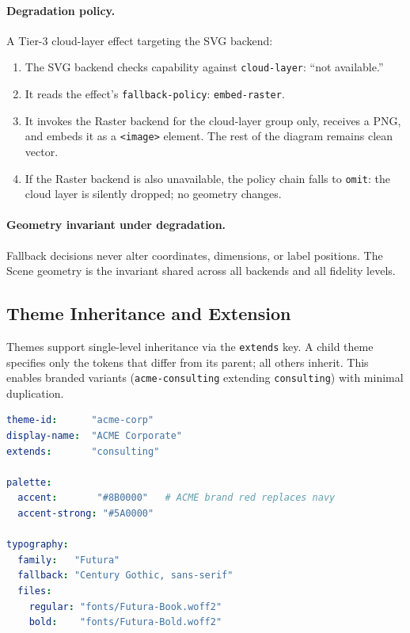 \paragraph{Degradation policy.}
A Tier-3 cloud-layer effect targeting the SVG backend:
\begin{enumerate}
  \item The SVG backend checks capability against \texttt{cloud-layer}: ``not available.''
  \item It reads the effect's \texttt{fallback-policy}: \texttt{embed-raster}.
  \item It invokes the Raster backend for the cloud-layer group only, receives a PNG, and
        embeds it as a \texttt{<image>} element. The rest of the diagram remains clean
        vector.
  \item If the Raster backend is also unavailable, the policy chain falls to
        \texttt{omit}: the cloud layer is silently dropped; no geometry changes.
\end{enumerate}

\paragraph{Geometry invariant under degradation.}
Fallback decisions never alter coordinates, dimensions, or label positions. The Scene
geometry is the invariant shared across all backends and all fidelity levels.

\subsection{Theme Inheritance and Extension}
\label{sec:theme-inheritance}

Themes support single-level inheritance via the \texttt{extends} key. A child theme
specifies only the tokens that differ from its parent; all others inherit. This enables
branded variants (\texttt{acme-consulting} extending \texttt{consulting}) with minimal
duplication.

\begin{lstlisting}[language=yaml,caption={Custom theme extending Consulting (general-contract form)}]
theme-id:      "acme-corp"
display-name:  "ACME Corporate"
extends:       "consulting"

palette:
  accent:       "#8B0000"   # ACME brand red replaces navy
  accent-strong: "#5A0000"

typography:
  family:   "Futura"
  fallback: "Century Gothic, sans-serif"
  files:
    regular: "fonts/Futura-Book.woff2"
    bold:    "fonts/Futura-Bold.woff2"
\end{lstlisting}

